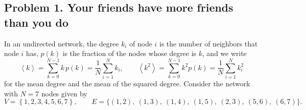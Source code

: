 \documentclass[a4paper,12pt]{article}
\begin{document}
\subsection*{Problem 1. Your friends have more friends than you do}

In an undirected network, the degree $k_i$ of node $i$ is the number of neighbors that node $i$ has, $p(k)$ is the fraction of the nodes whose degree is $k$, and we write
\[ \left\langle k \right\rangle = \sum_{k=0}^{N-1} k\,p(k) = \frac{1}{N}\sum_{i=1}^{N} k_i,
\qquad
\left\langle k^2 \right\rangle = \sum_{k=0}^{N-1} k^2 p(k) = \frac{1}{N}\sum_{i=1}^{N} k_i^2 \]
for the mean degree and the mean of the squared degree. Consider the network with $N=7$ nodes given by
\[ V = \left\{ 1,2,3,4,5,6,7 \right\},
\qquad
E = \Big\{ (1,2),\ (1,3),\ (1,4),\ (1,5),\ (2,3),\ (5,6),\ (6,7) \Big\} . \]
\end{document}
